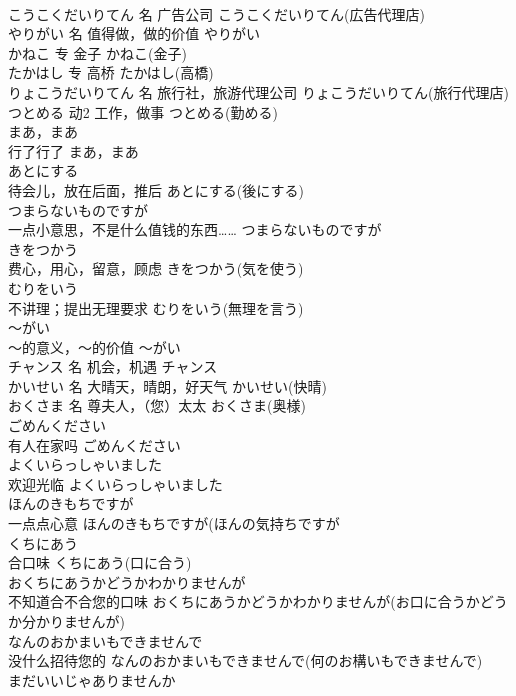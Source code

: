 \documentclass[8pt]{extreport}
\begin{document}
\begin{CJK}{UTF8}{min}
\\	こうこくだいりてん	名	广告公司	こうこくだいりてん(広告代理店)	
\\	やりがい	名	值得做，做的价值	やりがい	
\\	かねこ	专	金子	かねこ(金子)	
\\	たかはし	专	高桥	たかはし(高橋)	
\\	りょこうだいりてん	名	旅行社，旅游代理公司	りょこうだいりてん(旅行代理店)	
\\	つとめる	动2	工作，做事	つとめる(勤める)	
\\	まあ，まあ	
\\	行了行了	まあ，まあ	
\\	あとにする	
\\	待会儿，放在后面，推后	あとにする(後にする)	
\\	つまらないものですが	
\\	一点小意思，不是什么值钱的东西……	つまらないものですが	
\\	きをつかう	
\\	费心，用心，留意，顾虑	きをつかう(気を使う)	
\\	むりをいう	
\\	不讲理；提出无理要求	むりをいう(無理を言う)	
\\	～がい	
\\	～的意义，～的价值	～がい	
\\	チャンス	名	机会，机遇	チャンス	
\\	かいせい	名	大晴天，晴朗，好天气	かいせい(快晴)	
\\	おくさま	名	尊夫人，（您）太太	おくさま(奥様)	
\\	ごめんください	
\\	有人在家吗	ごめんください	
\\	よくいらっしゃいました	
\\	欢迎光临	よくいらっしゃいました	
\\	ほんのきもちですが	
\\	一点点心意	ほんのきもちですが(ほんの気持ちですが 
\\	くちにあう	
\\	合口味	くちにあう(口に合う)	
\\	おくちにあうかどうかわかりませんが	
\\	不知道合不合您的口味	おくちにあうかどうかわかりませんが(お口に合うかどうか分かりませんが)	
\\	なんのおかまいもできませんで	
\\	没什么招待您的	なんのおかまいもできませんで(何のお構いもできませんで)	
\\	まだいいじゃありませんか	

\end{CJK}
\end{document}
